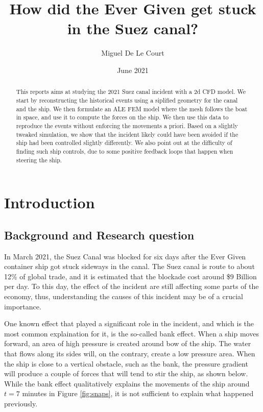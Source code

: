 \documentclass[a4paper]{article}
\title{How did the Ever Given get stuck in the Suez canal?}
\author{Miguel De Le Court}
\date{June 2021}
\begin{document}
\maketitle

\vfill

\begin{abstract}
    This reports aims at studying the 2021 Suez canal incident with a 2d CFD model. We start by reconstructing the historical events using a siplified geometry for the canal and the ship. We then formulate an ALE FEM model where the mesh follows the boat in space, and use it to compute the forces on the ship. We then use this data to reproduce the events without enforcing the movements a priori. Based on a slightly tweaked simulation, we show that the incident likely could have been avoided if the ship had been controlled slightly differently. We also point out at the difficulty of finding such ship controls, due to some positive feedback loops that happen when steering the ship.
\end{abstract}
\vfill

\tableofcontents

\newpage
\section{Introduction}
\subsection{Background and Research question}
In March 2021, the Suez Canal was blocked for six days after the Ever Given container ship got stuck sideways in the canal. The Suez canal is route to about 12\% of global trade, and it is estimated that the blockade cost around \$9 Billion per day\cite{bbc:cost}\cite{bbc:cost2}\cite{guardian:cost}. To this day, the effect of the incident are still affecting some parts of the economy\cite{consequ1}\cite{consequ2}, thus, understanding the causes of this incident may be of a crucial importance. 

One known effect that played a significant role in the incident, and which is the most common explaination for it, is the so-called bank effect. When a ship moves forward, an area of high pressure is created around bow of the ship. The water that flows along its sides will, on the contrary, create a low pressure area. When the ship is close to a vertical obstacle, such as the bank, the pressure gradient will produce a couple of forces that will tend to stir the ship\cite{bankeffect}, as shown below. While the bank effect qualitatively explains the movements of the ship around $t=7$ minutes in Figure \ref{fig:snaps}, it is not sufficient to explain what happened previously.
\end{document}

